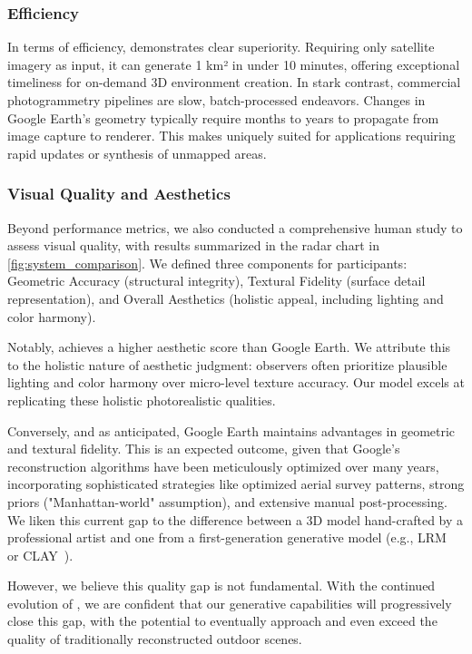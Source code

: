 \subsubsection{Efficiency}
In terms of efficiency, \method{} demonstrates clear superiority. Requiring only satellite imagery as input, it can generate 1 km² in under 10 minutes, offering exceptional timeliness for on-demand 3D environment creation. In stark contrast, commercial photogrammetry pipelines are slow, batch-processed endeavors. Changes in Google Earth's geometry typically require months to years to propagate from image capture to renderer.  This makes \method{} uniquely suited for applications requiring rapid updates or synthesis of unmapped areas.





\subsubsection{Visual Quality and Aesthetics}
Beyond performance metrics, we also conducted a comprehensive human study to assess visual quality, with results summarized in the radar chart in \cref{fig:system_comparison}. We defined three components for participants: Geometric Accuracy (structural integrity), Textural Fidelity (surface detail representation), and Overall Aesthetics (holistic appeal, including lighting and color harmony).

Notably, \method{} achieves a higher aesthetic score than Google Earth. We attribute this to the holistic nature of aesthetic judgment: observers often prioritize plausible lighting and color harmony over micro-level texture accuracy. Our model excels at replicating these holistic photorealistic qualities.

Conversely, and as anticipated, Google Earth maintains advantages in geometric and textural fidelity. This is an expected outcome, given that Google's reconstruction algorithms have been meticulously optimized over many years, incorporating sophisticated strategies like optimized aerial survey patterns, strong priors ("Manhattan-world" assumption), and extensive manual post-processing. We liken this current gap to the difference between a 3D model hand-crafted by a professional artist and one from a first-generation generative model (e.g., LRM~\cite{hong2024lrm} or CLAY~\cite{CLAY}).

However, we believe this quality gap is not fundamental. With the continued evolution of \method{}, we are confident that our generative capabilities will progressively close this gap, with the potential to eventually approach and even exceed the quality of traditionally reconstructed outdoor scenes.




